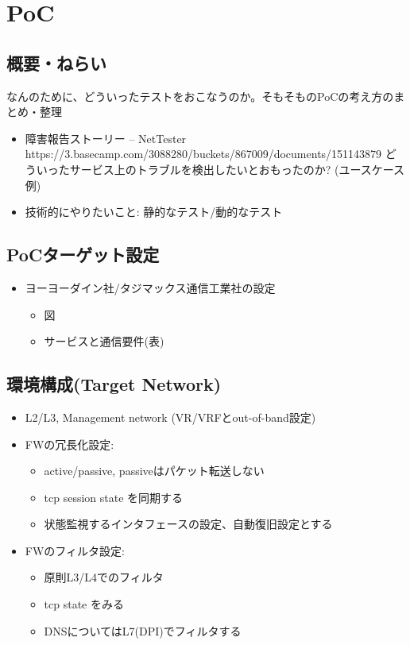 
\chapter{PoC}

\section{概要・ねらい}

なんのために、どういったテストをおこなうのか。そもそものPoCの考え方のまとめ・整理

\begin{itemize}
 \item 障害報告ストーリー – NetTester https://3.basecamp.com/3088280/buckets/867009/documents/151143879
       どういったサービス上のトラブルを検出したいとおもったのか? (ユースケース例)
 \item 技術的にやりたいこと:  静的なテスト/動的なテスト
\end{itemize}

\section{PoCターゲット設定}

 \begin{itemize}
  \item ヨーヨーダイン社/タジマックス通信工業社の設定
        \begin{itemize}
         \item 図
         \item サービスと通信要件(表)
        \end{itemize}
 \end{itemize}

\section{環境構成(Target Network)}

\begin{itemize}
 \item L2/L3, Management network (VR/VRFとout-of-band設定)
 \item FWの冗長化設定:
       \begin{itemize}
        \item active/passive, passiveはパケット転送しない
        \item tcp session state を同期する
        \item 状態監視するインタフェースの設定、自動復旧設定とする
       \end{itemize}
 \item FWのフィルタ設定:
       \begin{itemize}
        \item 原則L3/L4でのフィルタ
        \item tcp state をみる
        \item DNSについてはL7(DPI)でフィルタする
       \end{itemize}
\end{itemize}

